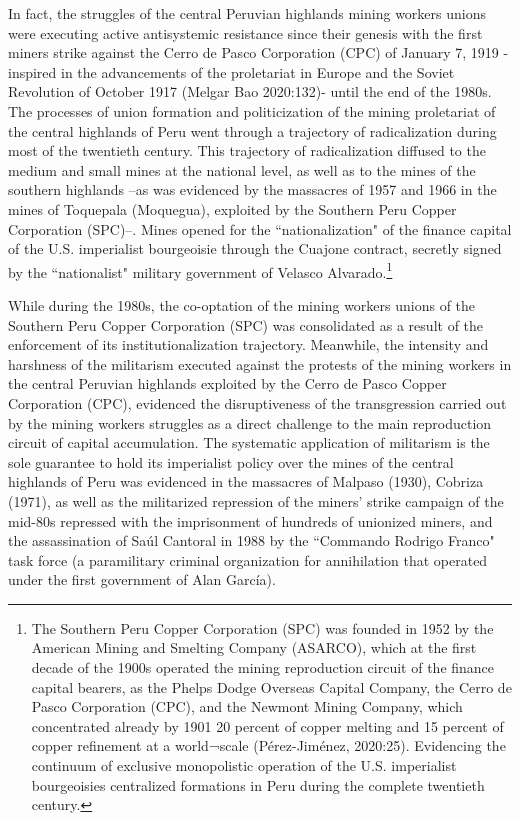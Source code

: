 \documentclass[]{interact}
\theoremstyle{plain}%
\theoremstyle{definition}
\theoremstyle{remark}
\begin{document}
In fact, the struggles of the central Peruvian highlands mining workers unions were executing active antisystemic resistance since their genesis with the first miners strike against the Cerro de Pasco Corporation (CPC) of January 7, 1919 -inspired in the advancements of the proletariat in Europe and the Soviet Revolution of October 1917 (Melgar Bao 2020:132)- until the end of the 1980s. The processes of union formation and politicization of the mining proletariat of the central highlands of Peru went through a trajectory of radicalization during most of the twentieth century. This trajectory of radicalization diffused to the medium and small mines at the national level, as well as to the mines of the southern highlands –as was evidenced by the massacres of 1957 and 1966 in the mines of Toquepala (Moquegua), exploited by the Southern Peru Copper Corporation (SPC)–. Mines opened for the “nationalization" of the finance capital of the U.S. imperialist bourgeoisie through the Cuajone contract, secretly signed by the “nationalist" military government of Velasco Alvarado.\footnote{The Southern Peru Copper Corporation (SPC) was founded in 1952 by the American Mining and Smelting Company (ASARCO), which at the first decade of the 1900s operated the mining reproduction circuit of the finance capital bearers, as the Phelps Dodge Overseas Capital Company, the Cerro de Pasco Corporation (CPC), and the Newmont Mining Company, which concentrated already by 1901 20 percent of copper melting and 15 percent of copper refinement at a world¬scale (Pérez-Jiménez, 2020:25). Evidencing the continuum of exclusive monopolistic operation of the U.S. imperialist bourgeoisies centralized formations in Peru during the complete twentieth century.}

While during the 1980s, the co-optation of the mining workers unions of the Southern Peru Copper Corporation (SPC) was consolidated as a result of the enforcement of its institutionalization trajectory. Meanwhile, the intensity and harshness of the militarism executed against the protests of the mining workers in the central Peruvian highlands exploited by the Cerro de Pasco Copper Corporation (CPC), evidenced the disruptiveness of the transgression carried out by the mining workers struggles as a direct challenge to the main reproduction circuit of capital accumulation. The systematic application of militarism is the sole guarantee to hold its imperialist policy over the mines of the central highlands of Peru was evidenced in the massacres of Malpaso (1930), Cobriza (1971), as well as the militarized repression of the miners' strike campaign of the mid-80s repressed with the imprisonment of hundreds of unionized miners, and the assassination of Saúl Cantoral in 1988 by the “Commando Rodrigo Franco" task force (a paramilitary criminal organization for annihilation that operated under the first government of Alan García).
\end{document}
